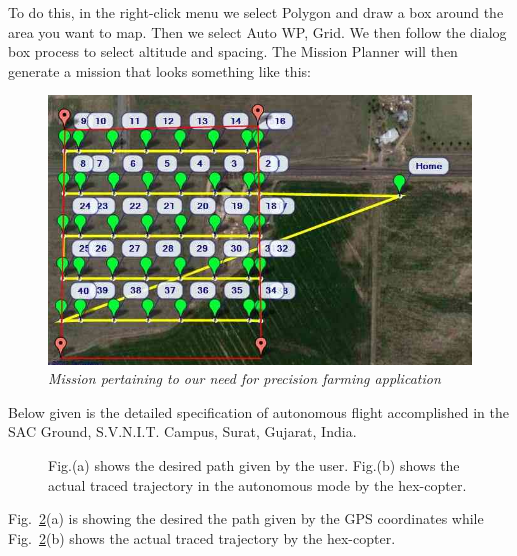 To do this, in the right-click menu we select Polygon and draw a box around the area you want to map. Then we select Auto WP, Grid. We then follow the dialog box process to select altitude and spacing. The Mission Planner will then generate a mission that looks something like this:
\begin{figure}[h]
	\includegraphics[width=1.0\linewidth]{mp_auto_mission_grid}
	\centering
	\caption{\label{fig: mp_auto_mission_grid}\textit{Mission pertaining to our need for precision farming application}}
\end{figure}



Below given is the detailed specification of autonomous flight accomplished in the SAC Ground, S.V.N.I.T. Campus, Surat, Gujarat, India. 

\begin{figure}[h]
	\hfill
	\hfill
	\hfill
	\caption{\label{fig: fin_mis}Fig.(a) shows the desired path given by the user. Fig.(b) shows the actual traced trajectory in the autonomous mode by the hex-copter.}
\end{figure} 

Fig.~\ref{fig: fin_mis}(a) is showing the desired the path given by the GPS coordinates while Fig.~\ref{fig: fin_mis}(b) shows the actual traced trajectory by the hex-copter.

